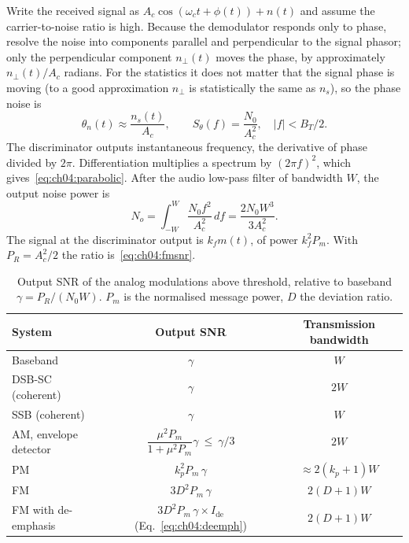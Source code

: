 \begin{deeper}
Write the received signal as $A_c\cos(\omega_ct+\phi(t))+n(t)$ and assume the carrier-to-noise ratio is
high. Because the demodulator responds only to phase, resolve the noise into components parallel and
perpendicular to the signal phasor; only the perpendicular component $n_\perp(t)$ moves the phase, by
approximately $n_\perp(t)/A_c$ radians. For the statistics it does not matter that the signal phase is
moving (to a good approximation $n_\perp$ is statistically the same as $n_s$), so the phase noise is
\begin{equation}
\theta_n(t)\approx\frac{n_s(t)}{A_c},\qquad S_{\theta}(f)=\frac{N_0}{A_c^2},\quad|f|<B_T/2.
\end{equation}
The discriminator outputs instantaneous frequency, the derivative of phase divided by $2\pi$.
Differentiation multiplies a spectrum by $(2\pi f)^2$, which gives~\eqref{eq:ch04:parabolic}. After the
audio low-pass filter of bandwidth $W$, the output noise power is
\begin{equation}
N_o=\int_{-W}^{W}\frac{N_0f^2}{A_c^2}\,df=\frac{2N_0W^3}{3A_c^2}.
\end{equation}
The signal at the discriminator output is $k_fm(t)$, of power $k_f^2P_m$. With $P_R=A_c^2/2$ the ratio
is~\eqref{eq:ch04:fmsnr}.
\end{deeper}

\begin{table}[htbp]\centering\small
\caption{Output SNR of the analog modulations above threshold, relative to baseband $\gamma=P_R/(N_0W)$.
$P_m$ is the normalised message power, $D$ the deviation ratio.}
\label{tab:ch04:snr}
\begin{tabular}{lcc}
\toprule
System & Output SNR & Transmission bandwidth \\
\midrule
Baseband & $\gamma$ & $W$ \\
DSB-SC (coherent) & $\gamma$ & $2W$ \\
SSB (coherent) & $\gamma$ & $W$ \\
AM, envelope detector & $\dfrac{\mu^2P_m}{1+\mu^2P_m}\gamma\ \le\ \gamma/3$ & $2W$ \\
PM & $k_p^2P_m\,\gamma$ & $\approx2(k_p+1)W$ \\
FM & $3D^2P_m\,\gamma$ & $2(D+1)W$ \\
FM with de-emphasis & $3D^2P_m\,\gamma\times I_{\text{de}}$ (Eq.~\ref{eq:ch04:deemph}) & $2(D+1)W$ \\
\bottomrule
\end{tabular}
\end{table}

